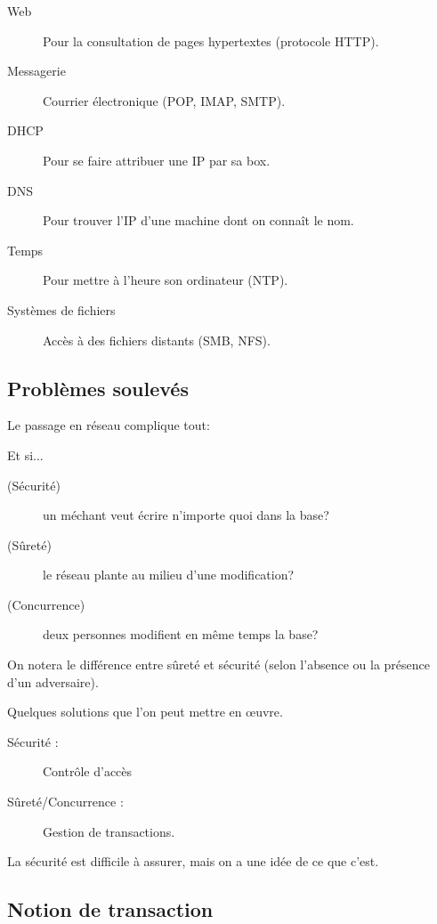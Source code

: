 \begin{exemple}
\begin{description}
\item[Web] Pour la consultation de pages hypertextes (protocole
  HTTP).
\item[Messagerie] Courrier électronique (POP, IMAP, SMTP).
\item[DHCP] Pour se faire attribuer une IP par sa box.
\item[DNS] Pour trouver l'IP d'une machine dont on connaît le
  nom.
\item[Temps] Pour mettre à l'heure son ordinateur (NTP).
\item[Systèmes de fichiers] Accès à des fichiers distants (SMB, NFS).
\end{description}
\end{exemple}

\subsection{Problèmes soulevés}

Le passage en réseau complique tout:

Et si...
\begin{description}
\item[(Sécurité)] un méchant veut écrire n'importe quoi dans la base?
\item[(Sûreté)] le réseau plante au milieu d'une modification?
\item[(Concurrence)] deux personnes modifient en même temps la base?
\end{description}

\begin{rem}
  On notera le différence entre sûreté et sécurité (selon l'absence ou la présence d'un adversaire).
\end{rem}
 
Quelques solutions que l'on peut mettre en {\oe}uvre.
\begin{description}
\item[Sécurité :] Contrôle d'accès
\item[Sûreté/Concurrence :] Gestion de transactions.
\end{description}

La sécurité est  difficile à assurer, mais on a une idée de ce que
c'est.


\subsection{Notion de transaction}

